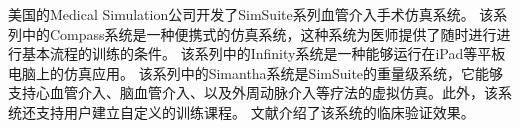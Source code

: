 美国的Medical Simulation公司开发了SimSuite\cite{simsuiteweb}系列血管介入手术仿真系统。
该系列中的Compass系统是一种便携式的仿真系统，这种系统为医师提供了随时进行进行基本流程的训练的条件。
该系列中的Infinity系统是一种能够运行在iPad等平板电脑上的仿真应用。
该系列中的Simantha系统是SimSuite的重量级系统，它能够支持心血管介入、脑血管介入、以及外周动脉介入等疗法的虚拟仿真。此外，该系统还支持用户建立自定义的训练课程。
文献\cite{Dawson2007SimSuite}介绍了该系统的临床验证效果。

%
%
%
%
%
